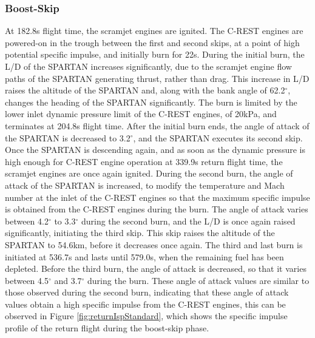 \subsubsection{ Boost-Skip}\label{sec:boost}
At 182.8s flight time, the scramjet engines are ignited. The C-REST engines are powered-on in the trough between the first and second skips, at a point of high potential specific impulse, and initially burn for 22s. During the initial burn, the L/D of the SPARTAN increases significantly, due to the scramjet engine flow paths of the SPARTAN generating thrust, rather than drag. 
This increase in L/D raises the altitude of the SPARTAN and, along with the bank angle of 62.2$^\circ$, changes the heading of the SPARTAN significantly. 
The burn is limited by the lower inlet dynamic pressure limit of the C-REST engines, of 20kPa, and terminates at 204.8s flight time. After the initial burn ends, the angle of attack of the SPARTAN is decreased to 3.2$^\circ$, and the SPARTAN executes its second skip. Once the SPARTAN is descending again, and as soon as the dynamic pressure is high enough for C-REST engine operation at 339.9s return flight time, the scramjet engines are once again ignited.
During the second burn, the angle of attack of the SPARTAN is increased, to modify the temperature and Mach number at the inlet of the C-REST engines so that the maximum specific impulse is obtained from the C-REST engines during the burn. 
The angle of attack varies between 4.2$^\circ$ to 3.3$^\circ$ during the second burn, and the L/D is once again raised significantly, initiating the third skip. 
This skip raises the altitude of the SPARTAN to 54.6km, before it decreases once again. 
The third and last burn is initiated at 536.7s and lasts until 579.0s, when the remaining fuel has been depleted. Before the third burn, the angle of attack is decreased, so that it varies between 4.5$^\circ$ and 3.7$^\circ$ during the burn. These angle of attack values are similar to those observed during the second burn, indicating that these angle of attack values obtain a high specific impulse from the C-REST engines, this can be observed in Figure \ref{fig:returnIspStandard}, which shows the specific impulse profile of the return flight during the boost-skip phase. 

